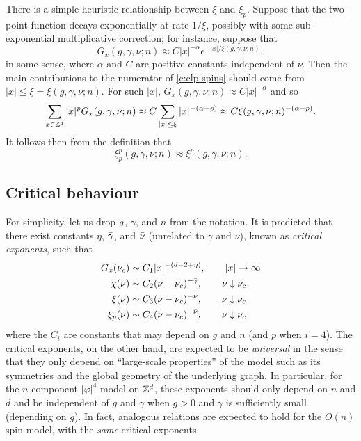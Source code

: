 \begin{rk}
There is a simple heuristic relationship between $\xi$ and $\xi_p$. Suppose that
the two-point function decays exponentially at rate $1/\xi$, possibly with some
sub-exponential multiplicative correction; for instance, suppose that
\begin{equation}
G_x(g, \gamma, \nu; n) \approx C |x|^{-\alpha} e^{-|x|/\xi(g, \gamma, \nu; n)},
\end{equation}
in some sense, where $\alpha$ and $C$ are positive constants independent of $\nu$.
Then the main contributions to the numerator of
\eqref{e:clp-spins} should come from $|x| \le \xi = \xi(g, \gamma, \nu; n)$. For such $|x|$,
$G_x(g, \gamma, \nu; n) \approx C |x|^{-\alpha}$ and so
\begin{equation}
\sum_{x\in{ {{\mathbb Z}}^d }} |x|^p G_x(g, \gamma, \nu; n)
	\approx
C \sum_{|x| \le \xi} |x|^{-(\alpha-p)}
	\approx
C \xi(g, \gamma, \nu; n)^{-(\alpha-p)}.
\end{equation}
It follows then from the definition that
\begin{equation}
\xi^p_p(g, \gamma, \nu; n) \approx \xi^p(g, \gamma, \nu; n).
\end{equation}
\end{rk}


\subsection{Critical behaviour}

For simplicity, let us drop $g$, $\gamma$, and $n$ from the notation.
It is predicted that there exist constants $\eta$, $\bar\gamma$, and $\bar\nu$
(unrelated to $\gamma$ and $\nu$), known as \emph{critical exponents}, such that
\begin{align}
\label{e:Gpred}
G_x(\nu_c)
	&\sim
C_1 |x|^{-(d - 2 + \eta)},
	\qquad
|x|\rightarrow\infty \\
\chi(\nu)
	&\sim
C_2 (\nu - \nu_c)^{-\bar\gamma},
	\qquad
\nu\downarrow\nu_c \\
\xi(\nu)
	&\sim
C_3 (\nu - \nu_c)^{-\bar\nu},
	\qquad
\nu\downarrow\nu_c \\
\label{e:xippred}
\xi_p(\nu)
	&\sim
C_4 (\nu - \nu_c)^{-\bar\nu},
	\qquad
\nu\downarrow\nu_c
\end{align}
where the $C_i$ are constants that may depend on $g$ and $n$ (and $p$ when $i = 4$).
The critical exponents, on the other hand, are expected to be \emph{universal} in the
sense that they only depend on ``large-scale properties'' of the model such as its
symmetries and the global geometry of the underlying graph. In particular,
for the $n$-component $|\varphi|^4$ model on ${ {{\mathbb Z}}^d }$, these exponents should only
depend on $n$ and $d$ and be independent of $g$ and $\gamma$ when $g > 0$ and $\gamma$
is sufficiently small (depending on $g$). In fact,
analogous relations are expected to hold for the $O(n)$ spin model, with the
\emph{same} critical exponents.

